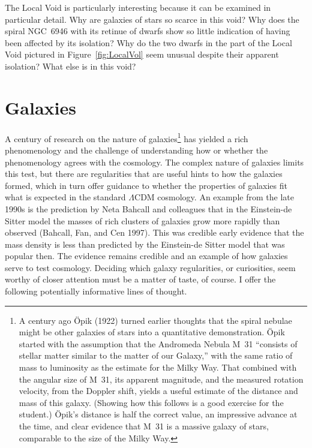 \documentclass[fleqn,usenatbib]{mnras}
\begin{document}
The Local Void is particularly interesting because it can be examined in particular detail. Why are galaxies of stars so scarce in this void? Why does the spiral NGC~6946 with its retinue of dwarfs show so little indication of having been affected by its isolation? Why do the two dwarfs in the part of the Local Void pictured in Figure~\ref{fig:LocalVol} seem unusual despite their apparent isolation? What else is in this void?

\section{Galaxies}\label{sec:galaxies} 

A century of research on the nature of galaxies\footnote{A century ago \"Opik (1922) turned earlier thoughts that the spiral nebulae might be other galaxies of stars into a quantitative demonstration. \"Opik started with the assumption that the Andromeda Nebula M~31 ``consists of stellar matter similar to the matter of our Galaxy,'' with the same ratio of mass to luminosity as the estimate for the Milky Way. That combined with the angular size of M~31, its apparent magnitude, and the measured rotation velocity, from the Doppler shift, yields a useful estimate of the distance and mass of this galaxy. (Showing how this follows is a good exercise for the student.)  \"Opik's distance is half the correct value, an impressive advance at the time, and clear evidence that M~31 is a massive galaxy of stars, comparable to the size of the Milky Way.} has yielded a rich phenomenology and the challenge of understanding how or whether the phenomenology agrees with the cosmology. The complex nature of galaxies limits this test, but there are regularities that are useful hints to how the galaxies formed, which in turn offer guidance to whether the properties of galaxies fit what is expected in the standard $\Lambda$CDM cosmology. An example from the late 1990s is the prediction by Neta Bahcall and colleagues that in the Einstein-de Sitter model the masses of rich clusters of galaxies grow more rapidly than observed (Bahcall, Fan, and Cen 1997). This was credible early evidence that the mass density is less than predicted by the Einstein-de Sitter model that was popular then. The evidence remains credible and an example of how galaxies serve to test cosmology. Deciding which galaxy regularities, or curiosities, seem  worthy of closer attention must be a matter of taste, of course. I offer the following potentially informative lines of thought. 
\end{document}
